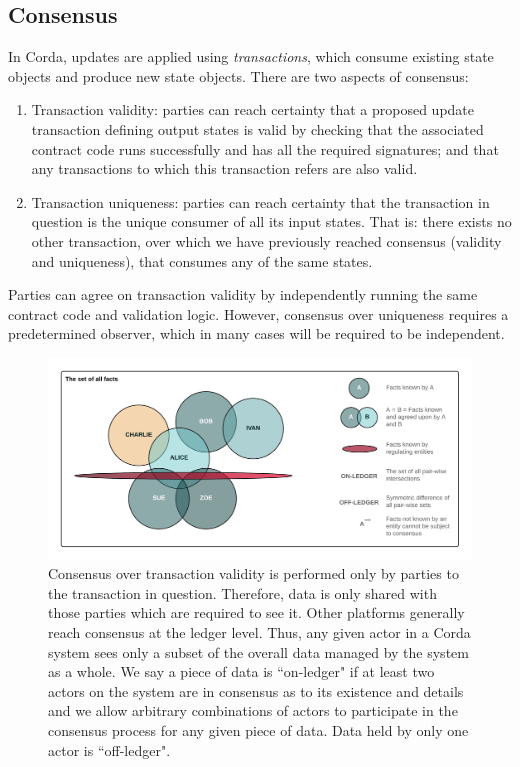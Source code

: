 \documentclass{article}
\begin{document}
\subsection{Consensus}
In Corda, updates are applied using \textit{transactions}, which consume existing state objects and produce new state objects. There are two aspects of consensus:
\begin{enumerate}
\item{Transaction validity: parties can reach certainty that a proposed update transaction defining output states is valid by checking that the associated contract code runs successfully and has all the required signatures; and that any transactions to which this transaction refers are also valid.}
\item{Transaction uniqueness: parties can reach certainty that the transaction in question is the unique consumer of all its input states. That is: there exists no other transaction, over which we have previously reached consensus (validity and uniqueness), that consumes any of the same states.}
\end{enumerate}

Parties can agree on transaction validity by independently running the same contract code and validation logic. However, consensus over uniqueness requires a predetermined observer, which in many cases will be required to be independent.

\begin{figure}[H]
    \includegraphics[scale = .5, center]{Consensus}
    \caption{Consensus over transaction validity is performed only by parties to the transaction in question. Therefore, data is only shared with those parties which are required to see it. Other platforms generally reach consensus at the ledger level. Thus, any given actor in a Corda system sees only a subset of the overall data managed by the system as a whole. We say a piece of data is ``on-ledger" if at least two actors on the system are in consensus as to its existence and details and we allow arbitrary combinations of actors to participate in the consensus process for any given piece of data. Data held by only one actor is ``off-ledger".}
\end{figure}
\end{document}
